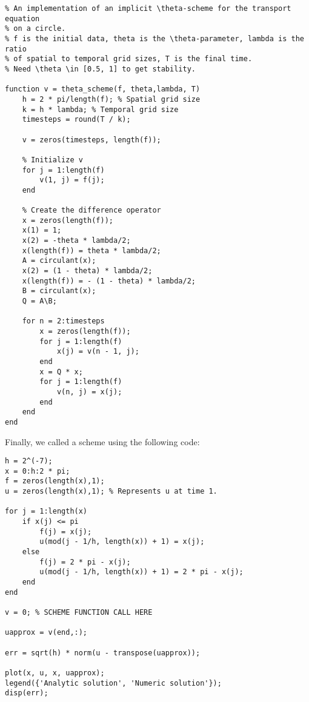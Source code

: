 \documentclass[10pt]{article}
\theoremstyle{definition}
\begin{document}
\begin{verbatim}
% An implementation of an implicit \theta-scheme for the transport equation
% on a circle.
% f is the initial data, theta is the \theta-parameter, lambda is the ratio
% of spatial to temporal grid sizes, T is the final time.
% Need \theta \in [0.5, 1] to get stability.

function v = theta_scheme(f, theta,lambda, T)
    h = 2 * pi/length(f); % Spatial grid size
    k = h * lambda; % Temporal grid size
    timesteps = round(T / k);

    v = zeros(timesteps, length(f));

    % Initialize v
    for j = 1:length(f)
        v(1, j) = f(j);
    end

    % Create the difference operator
    x = zeros(length(f));
    x(1) = 1;
    x(2) = -theta * lambda/2;
    x(length(f)) = theta * lambda/2;
    A = circulant(x);
    x(2) = (1 - theta) * lambda/2;
    x(length(f)) = - (1 - theta) * lambda/2;
    B = circulant(x);
    Q = A\B;

    for n = 2:timesteps
        x = zeros(length(f));
        for j = 1:length(f)
            x(j) = v(n - 1, j);
        end
        x = Q * x;
        for j = 1:length(f)
            v(n, j) = x(j);
        end
    end
end
\end{verbatim}

Finally, we called a scheme using the following code:

\begin{verbatim}
h = 2^(-7);
x = 0:h:2 * pi;
f = zeros(length(x),1);
u = zeros(length(x),1); % Represents u at time 1.

for j = 1:length(x)
    if x(j) <= pi
        f(j) = x(j);
        u(mod(j - 1/h, length(x)) + 1) = x(j);
    else
        f(j) = 2 * pi - x(j);
        u(mod(j - 1/h, length(x)) + 1) = 2 * pi - x(j);
    end
end

v = 0; % SCHEME FUNCTION CALL HERE

uapprox = v(end,:);

err = sqrt(h) * norm(u - transpose(uapprox));

plot(x, u, x, uapprox);
legend({'Analytic solution', 'Numeric solution'});
disp(err);
\end{verbatim}
\end{document}
